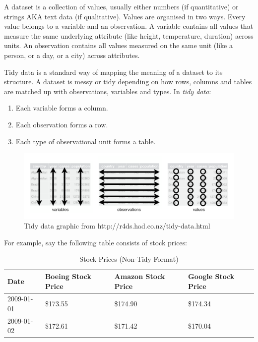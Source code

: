 \documentclass[12pt,]{krantz}
\providecommand{\tightlist}{%
  \setlength{\itemsep}{0pt}\setlength{\parskip}{0pt}}
\renewenvironment{quote}{\begin{VF}}{\end{VF}}
\theoremstyle{definition}
\theoremstyle{definition}
\theoremstyle{definition}
\theoremstyle{remark}
\begin{document}
\begin{quote}
A dataset is a collection of values, usually either numbers (if
quantitative) or strings AKA text data (if qualitative). Values are
organised in two ways. Every value belongs to a variable and an
observation. A variable contains all values that measure the same
underlying attribute (like height, temperature, duration) across units.
An observation contains all values measured on the same unit (like a
person, or a day, or a city) across attributes.
\end{quote}

\begin{quote}
Tidy data is a standard way of mapping the meaning of a dataset to its
structure. A dataset is messy or tidy depending on how rows, columns and
tables are matched up with observations, variables and types. In
\emph{tidy data}:
\end{quote}

\begin{quote}
\begin{enumerate}
\def\labelenumi{\arabic{enumi}.}
\tightlist
\item
  Each variable forms a column.
\item
  Each observation forms a row.
\item
  Each type of observational unit forms a table.
\end{enumerate}
\end{quote}

\begin{figure}

{\centering \includegraphics[width=\textwidth]{images/tidy-1} 

}

\caption{Tidy data graphic from http://r4ds.had.co.nz/tidy-data.html}\label{fig:tidyfig}
\end{figure}

For example, say the following table consists of stock prices:

\begin{table}[H]

\caption{\label{tab:unnamed-chunk-61}Stock Prices (Non-Tidy Format)}
\centering
\fontsize{10}{12}\selectfont
\begin{tabular}[t]{llll}
\toprule
Date & Boeing Stock Price & Amazon Stock Price & Google Stock Price\\
\midrule
2009-01-01 & \$173.55 & \$174.90 & \$174.34\\
2009-01-02 & \$172.61 & \$171.42 & \$170.04\\
\bottomrule
\end{tabular}
\end{table}
\end{document}
